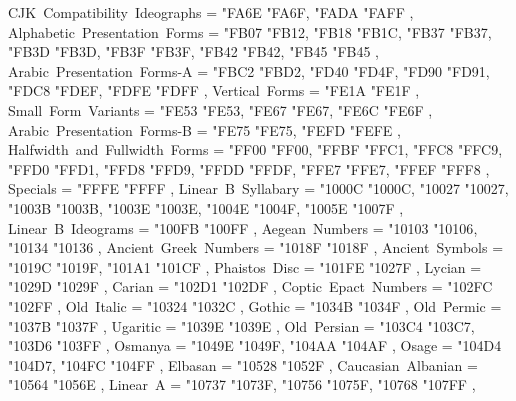 {    CJK~Compatibility~Ideographs                   = { {"FA6E} {"FA6F}, {"FADA} {"FAFF} },
    Alphabetic~Presentation~Forms                  = { {"FB07} {"FB12}, {"FB18} {"FB1C}, {"FB37} {"FB37}, {"FB3D} {"FB3D}, {"FB3F} {"FB3F}, {"FB42} {"FB42}, {"FB45} {"FB45} },
    Arabic~Presentation~Forms-A                    = { {"FBC2} {"FBD2}, {"FD40} {"FD4F}, {"FD90} {"FD91}, {"FDC8} {"FDEF}, {"FDFE} {"FDFF} },
    Vertical~Forms                                 = { {"FE1A} {"FE1F} },
    Small~Form~Variants                            = { {"FE53} {"FE53}, {"FE67} {"FE67}, {"FE6C} {"FE6F} },
    Arabic~Presentation~Forms-B                    = { {"FE75} {"FE75}, {"FEFD} {"FEFE} },
    Halfwidth~and~Fullwidth~Forms                  = { {"FF00} {"FF00}, {"FFBF} {"FFC1}, {"FFC8} {"FFC9}, {"FFD0} {"FFD1}, {"FFD8} {"FFD9}, {"FFDD} {"FFDF}, {"FFE7} {"FFE7}, {"FFEF} {"FFF8} },
    Specials                                       = { {"FFFE} {"FFFF} },
    Linear~B~Syllabary                             = { {"1000C} {"1000C}, {"10027} {"10027}, {"1003B} {"1003B}, {"1003E} {"1003E}, {"1004E} {"1004F}, {"1005E} {"1007F} },
    Linear~B~Ideograms                             = { {"100FB} {"100FF} },
    Aegean~Numbers                                 = { {"10103} {"10106}, {"10134} {"10136} },
    Ancient~Greek~Numbers                          = { {"1018F} {"1018F} },
    Ancient~Symbols                                = { {"1019C} {"1019F}, {"101A1} {"101CF} },
    Phaistos~Disc                                  = { {"101FE} {"1027F} },
    Lycian                                         = { {"1029D} {"1029F} },
    Carian                                         = { {"102D1} {"102DF} },
    Coptic~Epact~Numbers                           = { {"102FC} {"102FF} },
    Old~Italic                                     = { {"10324} {"1032C} },
    Gothic                                         = { {"1034B} {"1034F} },
    Old~Permic                                     = { {"1037B} {"1037F} },
    Ugaritic                                       = { {"1039E} {"1039E} },
    Old~Persian                                    = { {"103C4} {"103C7}, {"103D6} {"103FF} },
    Osmanya                                        = { {"1049E} {"1049F}, {"104AA} {"104AF} },
    Osage                                          = { {"104D4} {"104D7}, {"104FC} {"104FF} },
    Elbasan                                        = { {"10528} {"1052F} },
    Caucasian~Albanian                             = { {"10564} {"1056E} },
    Linear~A                                       = { {"10737} {"1073F}, {"10756} {"1075F}, {"10768} {"107FF} },
}
